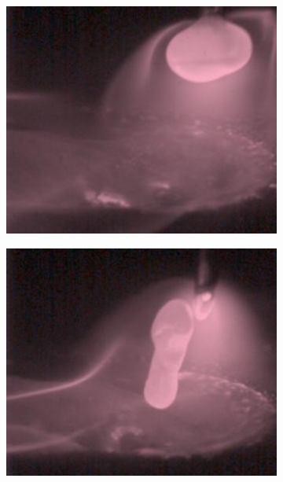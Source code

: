 \begin{figure}
    \centering
    \begin{subfigure}[b]{0.3\textwidth}
        \includegraphics[width=\textwidth]{Images/Dataset/glob_sample_0.jpg}
        \caption{}
    \end{subfigure}
\hfill
    \begin{subfigure}[b]{0.3\textwidth}
        \includegraphics[width=\textwidth]{Images/Dataset/glob_sample_749.jpg}
        \caption{}
        \label{fig:glob_sample_irregular}

\end{subfigure}
\end{figure}
